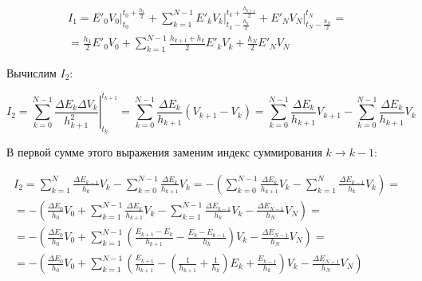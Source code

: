 \begin{equation}\label{AppVarI1Exp}
\begin{array}{c}
I_1 = \left. E'_0 V_0 \right|_{t_0}^{t_0+\frac{h_1}{2}} +
      \sum\limits_{k=1}^{N-1} \left. E'_k V_k \right|_{t_k-\frac{h_k}{2}}^{t_k+\frac{h_{k+1}}{2}} +
      \left. E'_N V_N \right|_{t_N-\frac{h_N}{2}}^{t_N} = \\[1em]

    = \frac{h_1}{2} E'_0 V_0 +
      \sum\limits_{k=1}^{N-1} \frac{h_{k+1} + h_k}{2} E'_k V_k +
      \frac{h_N}{2} E'_N V_N
\end{array}
\end{equation}

Вычислим $I_2$:

\begin{equation}
I_2 = \sum\limits_{k=0}^{N-1} \left. \frac{\Delta E_k \Delta V_k}{h_{k+1}^2} \right|_{t_k}^{t_{k+1}} =
      \sum\limits_{k=0}^{N-1} \frac{\Delta E_k}{h_{k+1}} (V_{k+1} - V_k) =
      \sum\limits_{k=0}^{N-1} \frac{\Delta E_k}{h_{k+1}} V_{k+1} -
      \sum\limits_{k=0}^{N-1} \frac{\Delta E_k}{h_{k+1}} V_k
\end{equation}

В первой сумме этого выражения заменим индекс суммирования $k \rightarrow k - 1$:

\begin{equation}\label{AppVarI2Exp}
\begin{array}{c}
I_2 = \sum\limits_{k=1}^{N} \frac{\Delta E_{k-1}}{h_k} V_k -
      \sum\limits_{k=0}^{N-1} \frac{\Delta E_k}{h_{k+1}} V_k =
      - \left( \sum\limits_{k=0}^{N-1} \frac{\Delta E_k}{h_{k+1}} V_k -
      \sum\limits_{k=1}^{N} \frac{\Delta E_{k-1}}{h_k} V_k \right) = \\[1em]

   =  - \left( \frac{\Delta E_0}{h_0} V_0 + \sum\limits_{k=1}^{N-1} \frac{\Delta E_k}{h_{k+1}} V_k -
      \sum\limits_{k=1}^{N-1} \frac{\Delta E_{k-1}}{h_k} V_k - \frac{\Delta E_{N-1}}{h_N} V_N \right) = \\[1em]

   =  - \left( \frac{\Delta E_0}{h_0} V_0 + \sum\limits_{k=1}^{N-1} \left( \frac{E_{k+1} - E_k}{h_{k+1}} -
      \frac{E_k - E_{k-1}}{h_k} \right) V_k - \frac{\Delta E_{N-1}}{h_N} V_N \right) = \\[1em]

   =  - \left( \frac{\Delta E_0}{h_0} V_0 + \sum\limits_{k=1}^{N-1} \left( \frac{E_{k+1}}{h_{k+1}} -
      \left(\frac{1}{h_{k+1}} + \frac{1}{h_k}\right)E_k + \frac{E_{k-1}}{h_k} \right) V_k - \frac{\Delta E_{N-1}}{h_N} V_N \right)
\end{array}
\end{equation}

